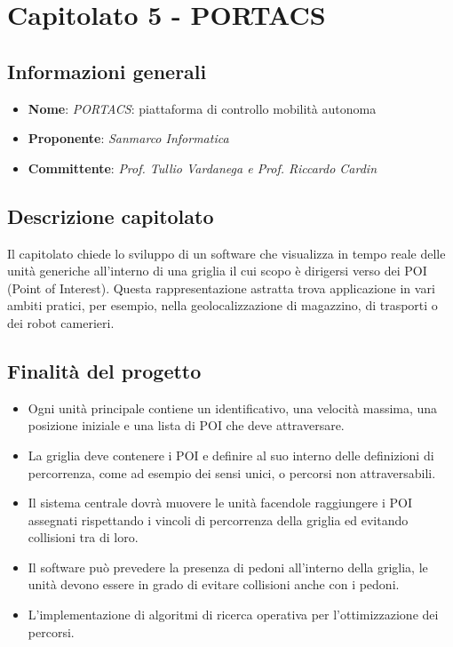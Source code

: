 \section{Capitolato 5 - PORTACS}
\subsection{Informazioni generali}
\begin{itemize}
    \item \textbf{Nome}: \emph{PORTACS}: piattaforma di controllo mobilità autonoma
    \item \textbf{Proponente}: \emph{Sanmarco Informatica}
    \item \textbf{Committente}: \emph{Prof. Tullio Vardanega e Prof. Riccardo Cardin}
\end{itemize}
\subsection{Descrizione capitolato}
Il capitolato chiede lo sviluppo di un software che visualizza in tempo reale delle unità generiche all’interno di una griglia il cui scopo è dirigersi verso dei POI (Point of Interest). Questa rappresentazione astratta trova applicazione in vari ambiti pratici, per esempio, nella geolocalizzazione di magazzino, di trasporti o dei robot camerieri.
\subsection{Finalità del progetto}
\begin{itemize}
    \item Ogni unità principale contiene un identificativo, una velocità massima, una posizione iniziale e una lista di POI che deve attraversare.
    \item La griglia deve contenere i POI e definire al suo interno delle definizioni di percorrenza, come ad esempio dei sensi unici, o percorsi non attraversabili.
    \item Il sistema centrale dovrà muovere le unità facendole raggiungere i POI assegnati rispettando i vincoli di percorrenza della griglia ed evitando collisioni tra di loro.
    \item Il software può prevedere la presenza di pedoni all’interno della griglia, le unità devono essere in grado di evitare collisioni anche con i pedoni.
    \item L’implementazione di algoritmi di ricerca operativa per l’ottimizzazione dei percorsi.
\end{itemize}
